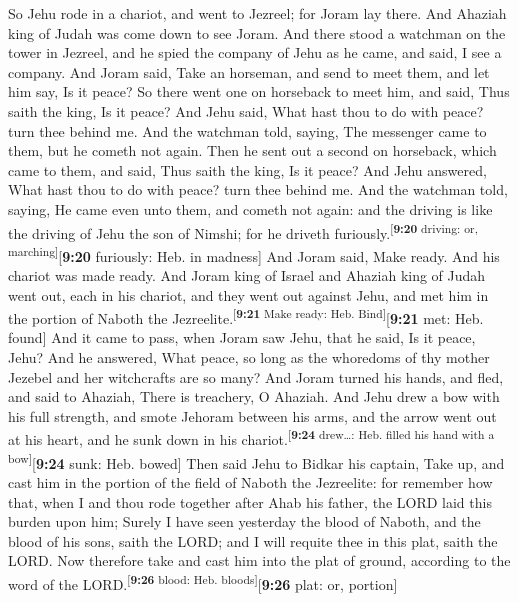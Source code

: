  So Jehu rode in a chariot, and went to Jezreel; for
Joram lay there. And Ahaziah king of Judah was come down to see Joram.
 And there stood a watchman on the tower in Jezreel, and
he spied the company of Jehu as he came, and said, I see a company. And
Joram said, Take an horseman, and send to meet them, and let him say, Is
it peace?  So there went one on horseback to meet him,
and said, Thus saith the king, Is it peace? And Jehu said, What hast
thou to do with peace? turn thee behind me. And the watchman told,
saying, The messenger came to them, but he cometh not again.
 Then he sent out a second on horseback, which came to
them, and said, Thus saith the king, Is it peace? And Jehu answered,
What hast thou to do with peace? turn thee behind me. 
And the watchman told, saying, He came even unto them, and cometh not
again: and the driving is like the driving of Jehu the son of Nimshi;
for he driveth furiously.\textsuperscript{{[}\textbf{9:20} driving: or,
marching{]}}{[}\textbf{9:20} furiously: Heb. in madness{]}
 And Joram said, Make ready. And his chariot was made
ready. And Joram king of Israel and Ahaziah king of Judah went out, each
in his chariot, and they went out against Jehu, and met him in the
portion of Naboth the Jezreelite.\textsuperscript{{[}\textbf{9:21} Make
ready: Heb. Bind{]}}{[}\textbf{9:21} met: Heb. found{]} 
And it came to pass, when Joram saw Jehu, that he said, Is it peace,
Jehu? And he answered, What peace, so long as the whoredoms of thy
mother Jezebel and her witchcrafts are so many?  And
Joram turned his hands, and fled, and said to Ahaziah, There is
treachery, O Ahaziah.  And Jehu drew a bow with his full
strength, and smote Jehoram between his arms, and the arrow went out at
his heart, and he sunk down in his
chariot.\textsuperscript{{[}\textbf{9:24} drew\ldots: Heb. filled his
hand with a bow{]}}{[}\textbf{9:24} sunk: Heb. bowed{]} 
Then said Jehu to Bidkar his captain, Take up, and cast him in the
portion of the field of Naboth the Jezreelite: for remember how that,
when I and thou rode together after Ahab his father, the LORD laid this
burden upon him;  Surely I have seen yesterday the blood
of Naboth, and the blood of his sons, saith the LORD; and I will requite
thee in this plat, saith the LORD. Now therefore take and cast him into
the plat of ground, according to the word of the
LORD.\textsuperscript{{[}\textbf{9:26} blood: Heb.
bloods{]}}{[}\textbf{9:26} plat: or, portion{]}

